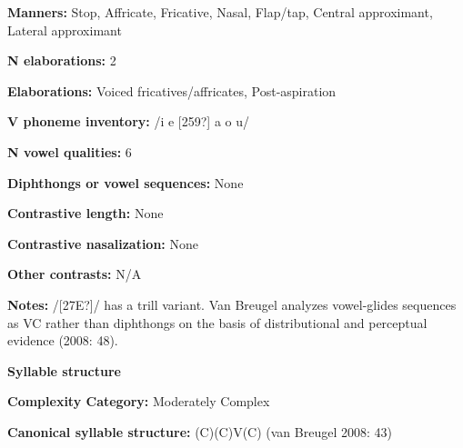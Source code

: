 \begin{styleBody}
\textbf{Manners:} Stop, Affricate, Fricative, Nasal, Flap/tap, Central approximant, Lateral approximant
\end{styleBody}

\begin{styleBody}
\textbf{N elaborations:} 2
\end{styleBody}

\begin{styleBody}
\textbf{Elaborations:} Voiced fricatives/affricates, Post-aspiration
\end{styleBody}

\begin{styleBody}
\textbf{V phoneme inventory:} /i e [259?] a o u/
\end{styleBody}

\begin{styleBody}
\textbf{N vowel qualities:} 6
\end{styleBody}

\begin{styleBody}
\textbf{Diphthongs or vowel sequences:} None
\end{styleBody}

\begin{styleBody}
\textbf{Contrastive length:} None
\end{styleBody}

\begin{styleBody}
\textbf{Contrastive nasalization:} None
\end{styleBody}

\begin{styleBody}
\textbf{Other contrasts:} N/A
\end{styleBody}

\begin{styleBody}
\textbf{Notes:} /[27E?]/ has a trill variant. Van Breugel analyzes vowel-glides sequences as VC rather than diphthongs on the basis of distributional and perceptual evidence (2008: 48).
\end{styleBody}

\begin{styleBody}
\textbf{Syllable structure}
\end{styleBody}

\begin{styleBody}
\textbf{Complexity Category:} Moderately Complex
\end{styleBody}

\begin{styleBody}
\textbf{Canonical syllable structure:} (C)(C)V(C)\textbf{ }(van Breugel 2008: 43)
\end{styleBody}

